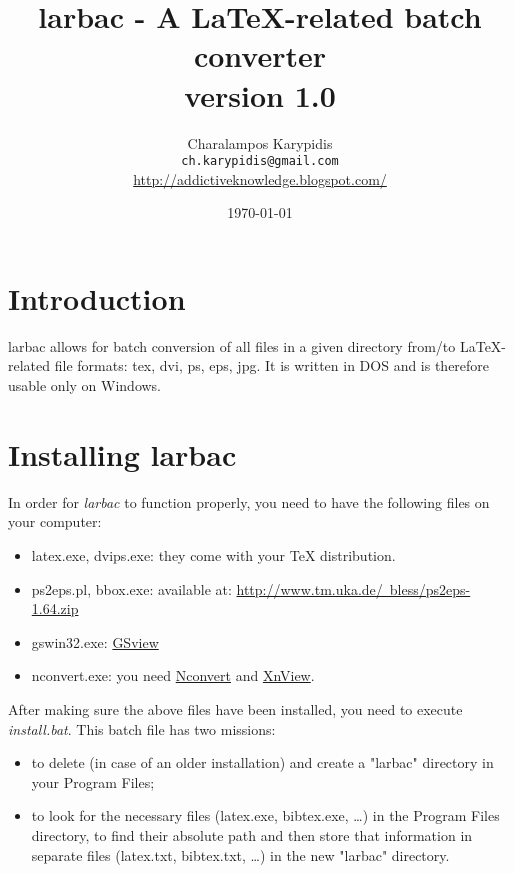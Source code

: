 \documentclass{article}
\begin{document}
\title{larbac - A LaTeX{}-related batch converter\\
version 1.0}

\author{Charalampos Karypidis\\
\texttt{ch.karypidis@gmail.com}\\
\url{http://addictiveknowledge.blogspot.com/}}

\date{\today}

\maketitle


\section{Introduction}

larbac allows for batch conversion of all files in a given directory from/to \LaTeX{}-related file formats: tex, dvi, ps, eps, jpg. It is written in DOS and is therefore usable only on Windows.


\section{Installing larbac}\label{sec:installing}

In order for \textit{larbac} to function properly, you need to have the following files on your computer:

\begin{itemize}
	\item latex.exe, dvips.exe: they come with your \TeX{} distribution.
	\item ps2eps.pl, bbox.exe: available at: \href{http://www.tm.uka.de/~bless/ps2eps-1.64.zip}{http://www.tm.uka.de/~bless/ps2eps-1.64.zip}
	\item gswin32.exe: \href{http://pages.cs.wisc.edu/~ghost/}{GSview}
	\item nconvert.exe: you need \href{http://www.xnview.com/en/nconvert/}{Nconvert} and \href{http://www.xnview.com/en/index.php}{XnView}.
\end{itemize}

After making sure the above files have been installed, you need to execute \textit{install.bat}. This batch file has two missions:
\begin{itemize}
\item to delete (in case of an older installation) and create a "larbac" directory in your Program Files;
\item to look for the necessary files (latex.exe, bibtex.exe, \ldots) in the Program Files directory, to find their absolute path and then store that information in separate files (latex.txt, bibtex.txt, \ldots) in the new "larbac" directory.
\end{itemize}
\end{document}
